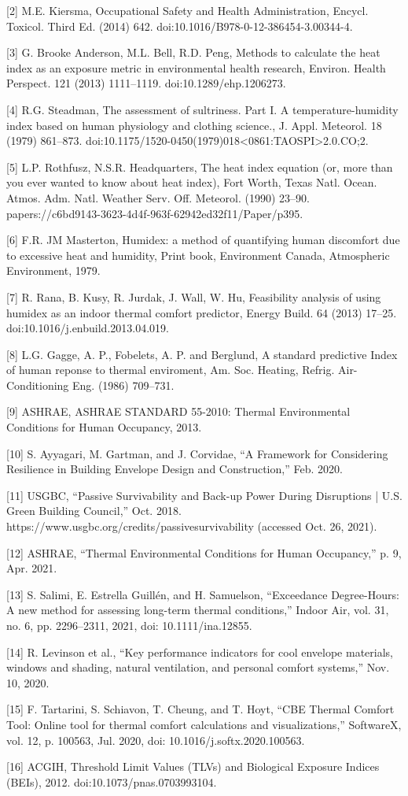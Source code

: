 {[}2{]} M.E. Kiersma, Occupational Safety and Health Administration, Encycl.
Toxicol. Third Ed. (2014) 642. doi:10.1016/B978-0-12-386454-3.00344-4.

{[}3{]} G. Brooke Anderson, M.L. Bell, R.D. Peng, Methods to calculate the heat
index as an exposure metric in environmental health research, Environ. Health
Perspect. 121 (2013) 1111–1119. doi:10.1289/ehp.1206273.

{[}4{]} R.G. Steadman, The assessment of sultriness. Part I. A
temperature-humidity index based on human physiology and clothing science., J.
Appl. Meteorol. 18 (1979) 861–873.
doi:10.1175/1520-0450(1979)018<0861:TAOSPI>2.0.CO;2.

{[}5{]} L.P. Rothfusz, N.S.R. Headquarters, The heat index equation (or, more
than you ever wanted to know about heat index), Fort Worth, Texas Natl. Ocean.
Atmos. Adm. Natl. Weather Serv. Off. Meteorol. (1990) 23–90.
papers://c6bd9143-3623-4d4f-963f-62942ed32f11/Paper/p395.

{[}6{]} F.R. JM Masterton, Humidex: a method of quantifying human discomfort due
to excessive heat and humidity, Print book, Environment Canada, Atmospheric
Environment, 1979.

{[}7{]} R. Rana, B. Kusy, R. Jurdak, J. Wall, W. Hu, Feasibility analysis of
using humidex as an indoor thermal comfort predictor, Energy Build. 64 (2013)
17–25. doi:10.1016/j.enbuild.2013.04.019.

{[}8{]} L.G. Gagge, A. P., Fobelets, A. P. and Berglund, A standard predictive
Index of human reponse to thermal enviroment, Am. Soc. Heating, Refrig.
Air-Conditioning Eng. (1986) 709–731.

{[}9{]} ASHRAE, ASHRAE STANDARD 55-2010: Thermal Environmental Conditions for
Human Occupancy, 2013.

{[}10{]} S. Ayyagari, M. Gartman, and J. Corvidae, ``A Framework for Considering
Resilience in Building Envelope Design and Construction,'' Feb. 2020.

{[}11{]} USGBC, ``Passive Survivability and Back-up Power During Disruptions |
U.S. Green Building Council,'' Oct. 2018.
https://www.usgbc.org/credits/passivesurvivability (accessed Oct. 26, 2021).

{[}12{]} ASHRAE, ``Thermal Environmental Conditions for Human Occupancy,'' p. 9,
Apr. 2021.

{[}13{]} S. Salimi, E. Estrella Guillén, and H. Samuelson, ``Exceedance
Degree-Hours: A new method for assessing long-term thermal conditions,'' Indoor
Air, vol. 31, no. 6, pp. 2296–2311, 2021, doi: 10.1111/ina.12855.

{[}14{]} R. Levinson et al., ``Key performance indicators for cool envelope
materials, windows and shading, natural ventilation, and personal comfort
systems,'' Nov. 10, 2020.

{[}15{]} F. Tartarini, S. Schiavon, T. Cheung, and T. Hoyt, ``CBE Thermal
Comfort Tool: Online tool for thermal comfort calculations and visualizations,''
SoftwareX, vol. 12, p. 100563, Jul. 2020, doi: 10.1016/j.softx.2020.100563.

{[}16{]} ACGIH, Threshold Limit Values (TLVs) and Biological Exposure Indices
(BEIs), 2012. doi:10.1073/pnas.0703993104.
